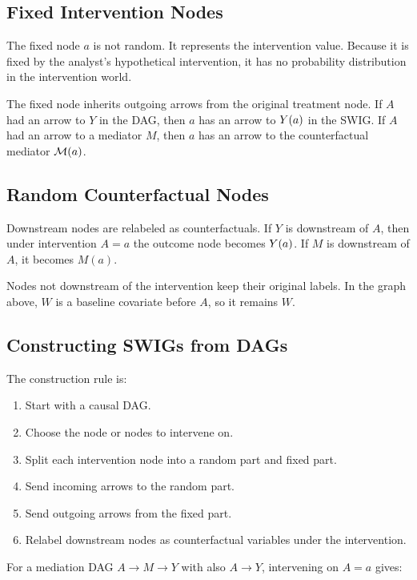 \subsection{Fixed Intervention Nodes}

The fixed node $a$ is not random. It represents the intervention value. Because it is fixed by the analyst's hypothetical intervention, it has no probability distribution in the intervention world.

The fixed node inherits outgoing arrows from the original treatment node. If $A$ had an arrow to $Y$ in the DAG, then $a$ has an arrow to $Y(a)$ in the SWIG. If $A$ had an arrow to a mediator $M$, then $a$ has an arrow to the counterfactual mediator $\mathcal{M}(a)$.

\subsection{Random Counterfactual Nodes}

Downstream nodes are relabeled as counterfactuals. If $Y$ is downstream of $A$, then under intervention $A=a$ the outcome node becomes $Y(a)$. If $M$ is downstream of $A$, it becomes $M(a)$.

Nodes not downstream of the intervention keep their original labels. In the graph above, $W$ is a baseline covariate before $A$, so it remains $W$.

\subsection{Constructing SWIGs from DAGs}

The construction rule is:
\begin{enumerate}
  \item Start with a causal DAG.
  \item Choose the node or nodes to intervene on.
  \item Split each intervention node into a random part and fixed part.
  \item Send incoming arrows to the random part.
  \item Send outgoing arrows from the fixed part.
  \item Relabel downstream nodes as counterfactual variables under the intervention.
\end{enumerate}

For a mediation DAG $A\to M\to Y$ with also $A\to Y$, intervening on $A=a$ gives:

